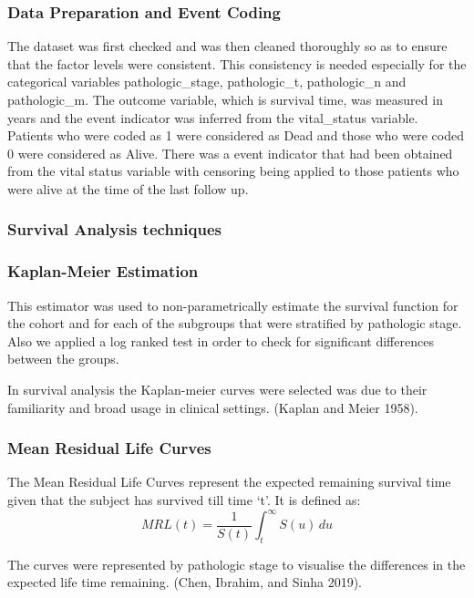\documentclass{article}
\begin{document}
\subsubsection{Data Preparation and Event Coding}\label{data-preparation-and-event-coding}

The dataset was first checked and was then cleaned thoroughly so as to ensure that the factor levels were consistent. This consistency is needed especially for the categorical variables pathologic\_stage, pathologic\_t, pathologic\_n and pathologic\_m. The outcome variable, which is survival time, was measured in years and the event indicator was inferred from the vital\_status variable. Patients who were coded as 1 were considered as Dead and those who were coded 0 were considered as Alive. There was a event indicator that had been obtained from the vital status variable with censoring being applied to those patients who were alive at the time of the last follow up.

\subsubsection{Survival Analysis techniques}\label{survival-analysis-techniques}

\subsubsection{Kaplan-Meier Estimation}\label{kaplan-meier-estimation}

This estimator was used to non-parametrically estimate the survival function for the cohort and for each of the subgroups that were stratified by pathologic stage. Also we applied a log ranked test in order to check for significant differences between the groups.

In survival analysis the Kaplan-meier curves were selected was due to their familiarity and broad usage in clinical settings. (Kaplan and Meier 1958).

\subsubsection{Mean Residual Life Curves}\label{mean-residual-life-curves}

The Mean Residual Life Curves represent the expected remaining survival time given that the subject has survived till time `t'. It is defined as:
\[
MRL(t) = \frac{1}{S(t)} \int_t^{\infty} S(u)\,du
\]

The curves were represented by pathologic stage to visualise the differences in the expected life time remaining. (Chen, Ibrahim, and Sinha 2019).
\end{document}
